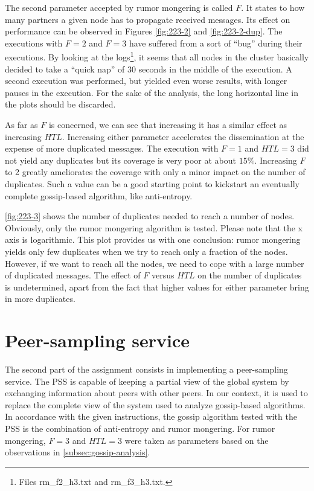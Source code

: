\documentclass[11pt,a4paper]{scrartcl}
\begin{document}
The second parameter accepted by rumor mongering is called $F$. It states to how many partners a given node has to propagate received messages. Its effect on performance can be observed in Figures \ref{fig:223-2} and \ref{fig:223-2-dup}. The executions with $F=2$ and $F=3$ have suffered from a sort of \enquote{bug} during their executions. By looking at the logs\footnote{Files \textsf{rm\_f2\_h3.txt} and \textsf{rm\_f3\_h3.txt}.}, it seems that all nodes in the cluster basically decided to take a \enquote{quick nap} of 30 seconds in the middle of the execution. A second execution was performed, but yielded even worse results, with longer pauses in the execution. For the sake of the analysis, the long horizontal line in the plots should be discarded.

As far as $F$ is concerned, we can see that increasing it has a similar effect as increasing $HTL$. Increasing either parameter accelerates the dissemination at the expense of more duplicated messages. The execution with $F=1$ and $HTL=3$ did not yield any duplicates but its coverage is very poor at about $15\%$. Increasing $F$ to 2 greatly ameliorates the coverage with only a minor impact on the number of duplicates. Such a value can be a good starting point to kickstart an eventually complete gossip-based algorithm, like anti-entropy.

\autoref{fig:223-3} shows the number of duplicates needed to reach a number of nodes. Obviously, only the rumor mongering algorithm is tested. Please note that the x axis is logarithmic. This plot provides us with one conclusion: rumor mongering yields only few duplicates when we try to reach only a fraction of the nodes. However, if we want to reach all the nodes, we need to cope with a large number of duplicated messages. The effect of $F$ versus $HTL$ on the number of duplicates is undetermined, apart from the fact that higher values for either parameter bring in more duplicates.

\section{Peer-sampling service}

The second part of the assignment consists in implementing a peer-sampling service. The PSS is capable of keeping a partial view of the global system by exchanging information about peers with other peers. In our context, it is used to replace the complete view of the system used to analyze gossip-based algorithms. In accordance with the given instructions, the gossip algorithm tested with the PSS is the combination of anti-entropy and rumor mongering. For rumor mongering, $F=3$ and $HTL=3$ were taken as parameters based on the observations in \autoref{subsec:gossip-analysis}.
\end{document}
